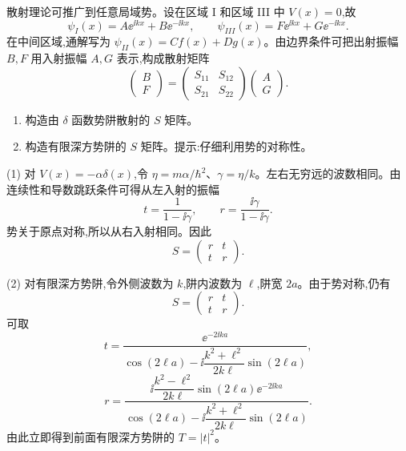 \begin{question}
散射理论可推广到任意局域势。设在区域 I 和区域 III 中 $V(x)=0$,故
\[
\psi_I(x)=A\ee^{\ii kx}+B\ee^{-\ii kx},\qquad
\psi_{III}(x)=F\ee^{\ii kx}+G\ee^{-\ii kx}.
\]
在中间区域,通解写为 $\psi_{II}(x)=Cf(x)+Dg(x)$。由边界条件可把出射振幅 $B,F$ 用入射振幅 $A,G$ 表示,构成散射矩阵
\[
\begin{pmatrix}B\\F\end{pmatrix}=\begin{pmatrix}S_{11}&S_{12}\\S_{21}&S_{22}\end{pmatrix}
\begin{pmatrix}A\\G\end{pmatrix}.
\]
\begin{enumerate}
\item 构造由 $\delta$ 函数势阱散射的 $S$ 矩阵。
\item 构造有限深方势阱的 $S$ 矩阵。提示:仔细利用势的对称性。
\end{enumerate}
\end{question}
\begin{solution}
(1) 对 $V(x)=-\alpha\delta(x)$,令 $\eta=m\alpha/\hbar^2$、$\gamma=\eta/k$。左右无穷远的波数相同。由连续性和导数跳跃条件可得从左入射的振幅
\[
t=\frac1{1-\ii\gamma},
\qquad
r=\frac{\ii\gamma}{1-\ii\gamma}.
\]
势关于原点对称,所以从右入射相同。因此
\[
S=\begin{pmatrix}r&t\\t&r\end{pmatrix}.
\]

(2) 对有限深方势阱,令外侧波数为 $k$,阱内波数为 $\ell$,阱宽 $2a$。由于势对称,仍有
\[
S=\begin{pmatrix}r&t\\t&r\end{pmatrix}.
\]
可取
\[
t=\frac{\ee^{-2\ii ka}}{\cos(2\ell a)-\ii\dfrac{k^2+\ell^2}{2k\ell}\sin(2\ell a)},
\]
\[
r=\frac{\ii\dfrac{k^2-\ell^2}{2k\ell}\sin(2\ell a)\ee^{-2\ii ka}}
{\cos(2\ell a)-\ii\dfrac{k^2+\ell^2}{2k\ell}\sin(2\ell a)}.
\]
由此立即得到前面有限深方势阱的 $T=|t|^2$。
\end{solution}

